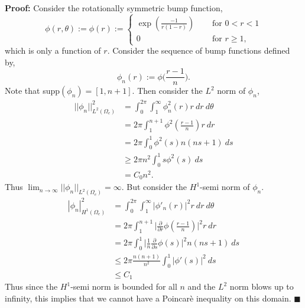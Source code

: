 \documentclass[11pt]{article}
\begin{document}
\textbf{Proof:} Consider the rotationally symmetric bump function, 
\begin{equation*}
    \phi(r,\theta) := \phi(r) := \begin{cases}
        \exp(\frac{-1}{r(1-r)}) &\quad \text{ for } 0 < r < 1 \\
        0 &\quad \text{ for } r \geq 1,
    \end{cases}
\end{equation*}
which is only a function of $r$.
Consider the sequence of bump functions defined by,
\begin{equation*}
    \phi_n(r) := \phi\Big(\frac{r-1}{n}\Big).
\end{equation*}
Note that supp$(\phi_n) = [1,n+1]$.
Then consider the $L^2$ norm of $\phi_n$,
\begin{align*}
    ||\phi_n||^2_{L^2(\Omega_e)} &= \int_0^{2\pi} \int_1^\infty \phi^2_n(r) r \: dr \: d\theta \\
    &= 2\pi \int_1^{n+1} \phi^2(\frac{r-1}{n}) r \: dr \\
    &= 2\pi \int_0^1 \phi^2(s) n (ns + 1) \: ds \\
    &\geq 2\pi n^2 \int_0^1 s \phi^2(s) \: ds \\
    &= C_0n^2.
\end{align*}
Thus $\lim_{n\to\infty} ||\phi_n||_{L^2(\Omega_e)} = \infty$.
But consider the $H^1$-semi norm of $\phi_n$.
\begin{align*}
    |\phi_n|^2_{H^1(\Omega_e)} &= \int_0^{2\pi} \int_1^\infty |\phi'_n(r)|^2 r \: dr \: d\theta \\
    &= 2\pi \int_1^{n+1} \Big|\frac{\partial}{\partial r}\phi(\frac{r-1}{n})\Big|^2 r \: dr \\
    &= 2\pi \int_0^{1} \Big| \frac{1}{n} \frac{\partial}{\partial s} \phi(s) \Big|^2 n (ns + 1) \: ds \\
    &\leq 2\pi \frac{n(n+1)}{n^2} \int_0^1 |\phi'(s)|^2 \: ds \\
    &\leq C_1
\end{align*}
Thus since the $H^1$-semi norm is bounded for all $n$ and the $L^2$ norm blows up to infinity, this implies that we cannot have a Poincar\`{e} inequality on this domain.
$\blacksquare$
\end{document}
